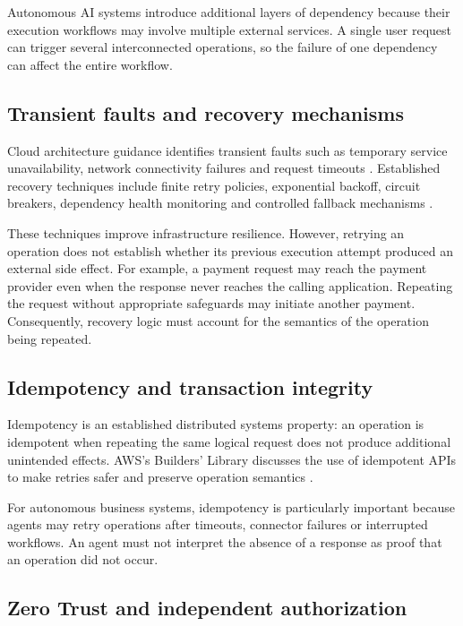 \documentclass[11pt,a4paper]{article}
\begin{document}
Autonomous AI systems introduce additional layers of dependency because their execution workflows may involve multiple external services. A single user request can trigger several interconnected operations, so the failure of one dependency can affect the entire workflow.

\subsection{Transient faults and recovery mechanisms}

Cloud architecture guidance identifies transient faults such as temporary service unavailability, network connectivity failures and request timeouts \cite{azuretransient}. Established recovery techniques include finite retry policies, exponential backoff, circuit breakers, dependency health monitoring and controlled fallback mechanisms \cite{azureretry,azurecb}.

These techniques improve infrastructure resilience. However, retrying an operation does not establish whether its previous execution attempt produced an external side effect. For example, a payment request may reach the payment provider even when the response never reaches the calling application. Repeating the request without appropriate safeguards may initiate another payment. Consequently, recovery logic must account for the semantics of the operation being repeated.

\subsection{Idempotency and transaction integrity}

Idempotency is an established distributed systems property: an operation is idempotent when repeating the same logical request does not produce additional unintended effects. AWS's Builders' Library discusses the use of idempotent APIs to make retries safer and preserve operation semantics \cite{aws}.

For autonomous business systems, idempotency is particularly important because agents may retry operations after timeouts, connector failures or interrupted workflows. An agent must not interpret the absence of a response as proof that an operation did not occur.

\subsection{Zero Trust and independent authorization}
\end{document}
